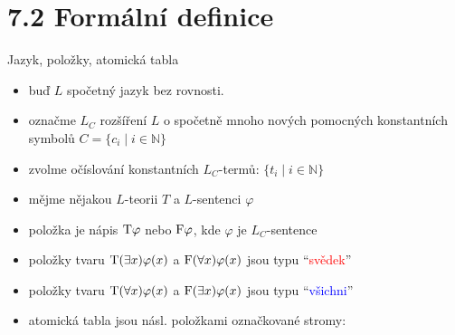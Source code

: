 \documentclass{beamer}
\begin{document}
\section{7.2 Formální definice}


\begin{frame}{Jazyk, položky, atomická tabla}

    \begin{itemize}[<+->]
        \item buď $L$ \alert{spočetný} jazyk \alert{bez rovnosti}.
        \item označme $L_C$ rozšíření $L$ o spočetně mnoho nových \alert{pomocných} konstantních symbolů $C=\{c_i\mid i\in \mathbb N\}$
        \item zvolme očíslování konstantních $L_C$-termů: $\{t_i\mid i\in\mathbb N\}$
        \item mějme nějakou $L$-teorii $T$ a $L$-sentenci $\varphi$
        \item \alert{položka} je nápis $\mathrm{T}\varphi$ nebo $\mathrm{F}\varphi$, kde $\varphi$ je $L_C$-sentence
        \item položky tvaru $\mathrm{T}(\exists x)\varphi(x)$ a $\mathrm{F}(\forall x)\varphi(x)$ jsou \alert{typu} ``\textcolor{red}{svědek}''
        \item položky tvaru $\mathrm{T}(\forall x)\varphi(x)$ a $\mathrm{F}(\exists x)\varphi(x)$ jsou \alert{typu} ``\textcolor{blue}{všichni}'' 
        \item \alert{atomická tabla} jsou násl. položkami označkované stromy:
    \end{itemize}

\end{frame}
\end{document}

